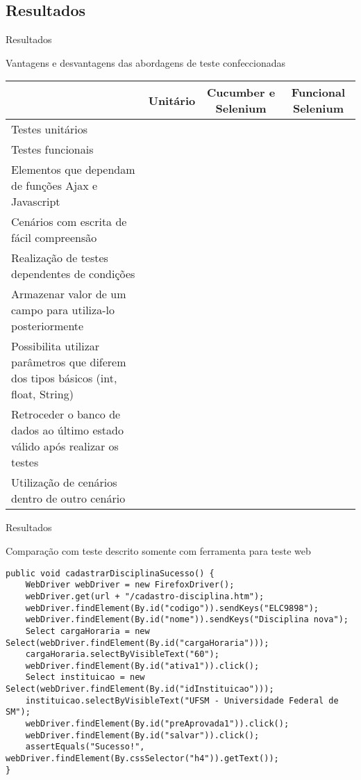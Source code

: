 \documentclass{beamer}
\begin{document}
\subsection{Resultados}
\begin{frame}{Resultados}
    \item Vantagens e desvantagens das abordagens de teste confeccionadas
    \begin{table}[!htpb]
        \tiny
        \begin{tabular}{p{5cm}|c|c|c}
        	& Unitário & Cucumber e Selenium & Funcional Selenium\\ \hline
        	Testes unitários & \checkmark & \checkmark & \checkmark \\ \hline
        	Testes funcionais &  & \checkmark & \checkmark \\ \hline
        	Elementos que dependam de funções Ajax e Javascript & & \checkmark & \checkmark \\ \hline
        	Cenários com escrita de fácil compreensão & & \checkmark & \\ \hline
        	Realização de testes dependentes de condições & & & \checkmark \\ \hline
        	Armazenar valor de um campo para utiliza-lo posteriormente & & & \checkmark \\ \hline
        	Possibilita utilizar parâmetros que diferem dos tipos básicos (int, float, String) & \checkmark & & \checkmark \\ \hline
        	Retroceder o banco de dados ao último estado válido após realizar os testes & & & \\ \hline
        	Utilização de cenários dentro de outro cenário & & & \checkmark \\ \hline
        \end{tabular}
    \end{table}
\end{frame}
\begin{frame}{Resultados}
    \item Comparação com teste descrito somente com ferramenta para teste web
    \begin{lstlisting}
public void cadastrarDisciplinaSucesso() {
	WebDriver webDriver = new FirefoxDriver();
	webDriver.get(url + "/cadastro-disciplina.htm");
	webDriver.findElement(By.id("codigo")).sendKeys("ELC9898");
	webDriver.findElement(By.id("nome")).sendKeys("Disciplina nova");
	Select cargaHoraria = new Select(webDriver.findElement(By.id("cargaHoraria")));
	cargaHoraria.selectByVisibleText("60");
	webDriver.findElement(By.id("ativa1")).click();
	Select instituicao = new Select(webDriver.findElement(By.id("idInstituicao")));
	instituicao.selectByVisibleText("UFSM - Universidade Federal de SM");
	webDriver.findElement(By.id("preAprovada1")).click();
	webDriver.findElement(By.id("salvar")).click();
	assertEquals("Sucesso!", webDriver.findElement(By.cssSelector("h4")).getText());
}
    \end{lstlisting}
\end{frame}
\begin{frame}
\titlepage
\end{frame}
\end{document}
